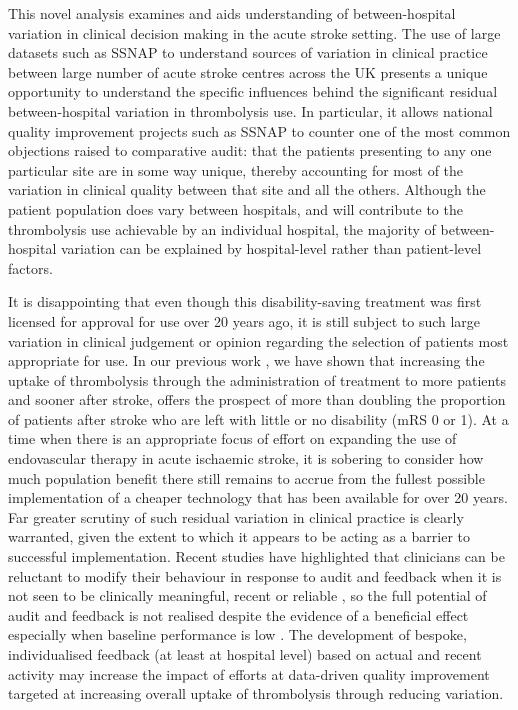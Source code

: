 This novel analysis examines and aids understanding of between-hospital variation in clinical decision making in the acute stroke setting. The use of large datasets such as SSNAP to understand sources of variation in clinical practice between large number of acute stroke centres across the UK presents a unique opportunity to understand the specific influences behind the significant residual between-hospital variation in thrombolysis use. In particular, it allows national quality improvement projects such as SSNAP to counter one of the most common objections raised to comparative audit: that the patients presenting to any one particular site are in some way unique, thereby accounting for most of the variation in clinical quality between that site and all the others. Although the patient population does vary between hospitals, and will contribute to the thrombolysis use achievable by an individual hospital, the majority of between-hospital variation can be explained by hospital-level rather than patient-level factors.

It is disappointing that even though this disability-saving treatment was first licensed for approval for use over 20 years ago, it is still subject to such large variation in clinical judgement or opinion regarding the selection of patients most appropriate for use. In our previous work \cite{allen_using_2022}, we have shown that increasing the uptake of thrombolysis through the administration of treatment to more patients and sooner after stroke, offers the prospect of more than doubling the proportion of patients after stroke who are left with little or no disability (mRS 0 or 1). At a time when there is an appropriate focus of effort on expanding the use of endovascular therapy in acute ischaemic stroke, it is sobering to consider how much population benefit there still remains to accrue from the fullest possible implementation of a cheaper technology that has been available for over 20 years. Far greater scrutiny of such residual variation in clinical practice is clearly warranted, given the extent to which it appears to be acting as a barrier to successful implementation. Recent studies have highlighted that clinicians can be reluctant to modify their behaviour in response to audit and feedback when it is not seen to be clinically meaningful, recent or reliable \cite{bekker_give_2022}, so the full potential of audit and feedback is not realised \cite{foy_revitalising_2020} despite the evidence of a beneficial effect especially when baseline performance is low \cite{ivers_audit_2012}. The development of bespoke, individualised feedback (at least at hospital level) based on actual and recent activity may increase the impact of efforts at data-driven quality improvement targeted at increasing overall uptake of thrombolysis through reducing variation.

